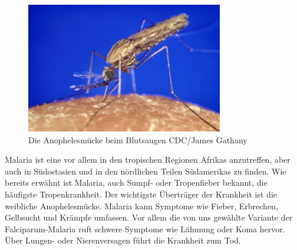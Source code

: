 \documentclass[10pt]{article}
\begin{document}
{        \begin{figure}
            \includegraphics[width=\linewidth]{Anophelesmucke}
            \caption{Die Anophelesmücke beim Blutsaugen CDC/James Gathany}
        \end{figure}
        Malaria ist eine vor allem in den tropischen Regionen Afrikas anzutreffen, aber auch in Südostasien und in den nördlichen Teilen Südamerikas zu finden. Wie bereits erwähnt ist Malaria, auch Sumpf- oder Tropenfieber bekannt, die häufigste Tropenkrankheit. Der wichtigste Überträger der Krankheit ist die weibliche Anophelesmücke. Malaria kann Symptome wie Fieber, Erbrechen, Gelbsucht und Krämpfe umfassen. Vor allem die von uns gewählte Variante der Falciparum-Malaria ruft schwere Symptome wie Lähmung oder Koma hervor. Über Lungen- oder Nierenversagen führt die Krankheit zum Tod.

}
\end{document}
